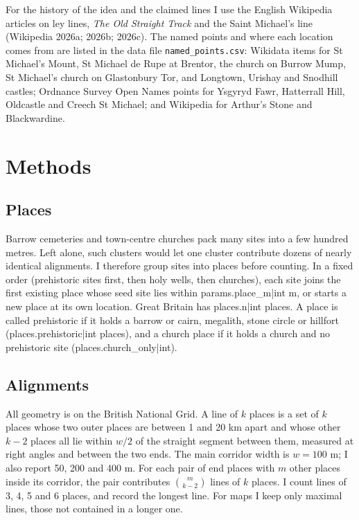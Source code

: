 \documentclass[11pt,a4paper]{article}
\begin{document}
For the history of the idea and the claimed lines I use the English Wikipedia articles on ley lines, \emph{The Old Straight Track} and the Saint Michael's line (Wikipedia 2026a; 2026b; 2026c). The named points and where each location comes from are listed in the data file \texttt{named\_points.csv}: Wikidata items for St Michael's Mount, St Michael de Rupe at Brentor, the church on Burrow Mump, St Michael's church on Glastonbury Tor, and Longtown, Urishay and Snodhill castles; Ordnance Survey Open Names points for Ysgyryd Fawr, Hatterrall Hill, Oldcastle and Creech St Michael; and Wikipedia for Arthur's Stone and Blackwardine.

\section{Methods}

\subsection{Places}

Barrow cemeteries and town-centre churches pack many sites into a few hundred metres. Left alone, such clusters would let one cluster contribute dozens of nearly identical alignments. I therefore group sites into places before counting. In a fixed order (prehistoric sites first, then holy wells, then churches), each site joins the first existing place whose seed site lies within {{params.place_m|int}} m, or starts a new place at its own location. Great Britain has {{places.n|int}} places. A place is called prehistoric if it holds a barrow or cairn, megalith, stone circle or hillfort ({{places.prehistoric|int}} places), and a church place if it holds a church and no prehistoric site ({{places.church_only|int}}).

\subsection{Alignments}

All geometry is on the British National Grid. A line of $k$ places is a set of $k$ places whose two outer places are between 1 and 20 km apart and whose other $k-2$ places all lie within $w/2$ of the straight segment between them, measured at right angles and between the two ends. The main corridor width is $w = 100$ m; I also report 50, 200 and 400 m. For each pair of end places with $m$ other places inside its corridor, the pair contributes $\binom{m}{k-2}$ lines of $k$ places. I count lines of 3, 4, 5 and 6 places, and record the longest line. For maps I keep only maximal lines, those not contained in a longer one.
\end{document}

